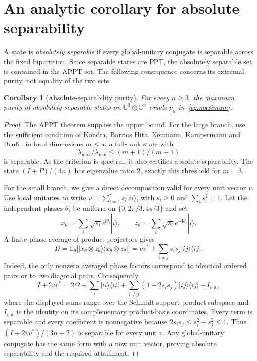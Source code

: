 \documentclass[11pt]{article}
\newtheorem{corollary}[theorem]{Corollary}
\theoremstyle{remark}\newtheorem{remark}[theorem]{Remark}
\newcommand{\C}{\mathbb C}
\begin{document}
\section{An analytic corollary for absolute separability}\label{sec:asep}
A state is \emph{absolutely separable} if every global-unitary conjugate is separable across the fixed bipartition. Since separable states are PPT, the absolutely separable set is contained in the APPT set. The following consequence concerns its extremal purity, not equality of the two sets.

\begin{corollary}[Absolute-separability purity]\label{cor:asep}
For every $n\geq3$, the maximum purity of absolutely separable states on $\C^3\otimes\C^n$ equals $p_n$ in~\eqref{eq:maximum}.
\end{corollary}
\begin{proof}
The APPT theorem supplies the upper bound. For the large branch, use the sufficient condition of Kondra, Barrios Hita, Neumann, Kampermann and Bru{\ss} \cite[Supplemental Material, Lemma 2]{Kondra}: in local dimensions $m\leq n$, a full-rank state with
\[
 \lambda_{\max}/\lambda_{\min}\leq(m+1)/(m-1)
\]
is separable. As the criterion is spectral, it also certifies absolute separability. The state $(I+P)/(4n)$ has eigenvalue ratio $2$, exactly this threshold for $m=3$.

For the small branch, we give a direct decomposition valid for every unit vector $v$. Use local unitaries to write $v=\sum_{i=1}^r s_i|ii\rangle$, with $s_i\geq0$ and $\sum_i s_i^2=1$. Let the independent phases $\theta_i$ be uniform on $\{0,2\pi/3,4\pi/3\}$ and set
\[
 x_\theta=\sum_i\sqrt{s_i}e^{\mathrm{i}\theta_i}|i\rangle,
 \qquad z_\theta=\sum_i\sqrt{s_i}e^{-\mathrm{i}\theta_i}|i\rangle.
\]
A finite phase average of product projectors gives
\[
 \Omega=\mathbb E_\theta\bigl[|x_\theta\otimes z_\theta\rangle
        \langle x_\theta\otimes z_\theta|\bigr]
 =vv^*+\sum_{i\ne j}s_i s_j|ij\rangle\langle ij|.
\]
Indeed, the only nonzero averaged phase factors correspond to identical ordered pairs or to two diagonal pairs. Consequently
\[
 I+2vv^*=2\Omega+\sum_i|ii\rangle\langle ii|
       +\sum_{i\ne j}(1-2s_i s_j)|ij\rangle\langle ij|+I_{\mathrm{out}},
\]
where the displayed sums range over the Schmidt-support product subspace and $I_{\mathrm{out}}$ is the identity on its complementary product-basis coordinates. Every term is separable and every coefficient is nonnegative because $2s_i s_j\leq s_i^2+s_j^2\leq1$. Thus $(I+2vv^*)/(3n+2)$ is separable for every unit $v$. Any global-unitary conjugate has the same form with a new unit vector, proving absolute separability and the required attainment.
\end{proof}
\end{document}
